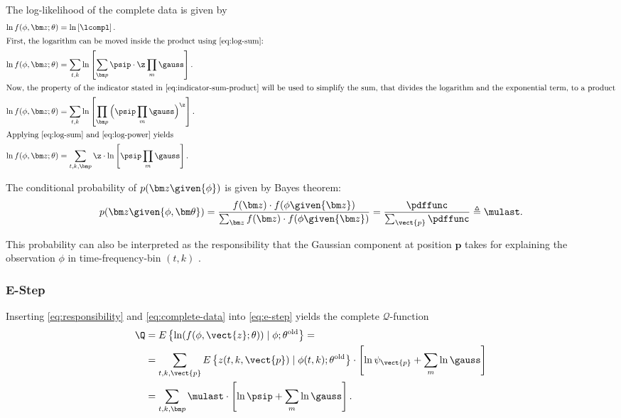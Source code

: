 The log-likelihood of the complete data is given by
\begin{align}
    \ln f(\phi,\bm z; \theta) &= \ln \left [ \lcompl \right ].\\
    \intertext{First, the logarithm can be moved inside the product using \eqref{eq:log-sum}:}
    \ln f(\phi,\bm z; \theta) &=\sum_{t,k}\ln \left [\sum_{\bm p}\psip\cdot\z\prod_{m}\gauss\right ].\\
    \intertext{Now, the property of the indicator stated in \eqref{eq:indicator-sum-product} will be used to simplify the sum, that divides the logarithm and the exponential term, to a product}
    \ln f(\phi,\bm z; \theta) &=\sum_{t,k}\ln \left [\prod_{\bm p}\Big (\psip\prod_{m}\gauss\Big )^{\z}\right ].\\
    \intertext{Applying \eqref{eq:log-sum} and \eqref{eq:log-power} yields}
    \label{eq:complete-data}
    \ln f(\phi,\bm z; \theta) &=\sum_{t,k,\bm p}\z\cdot\ln \left [\psip\prod_{m}\gauss\right ].
\end{align}

The conditional probability of $p(\bm z\given{\phi})$ is given by Bayes theorem:
\begin{equation}
\label{eq:responsibility}
    p(\bm z\given{\phi,\bm\theta})=\frac{f(\bm z)\cdot f(\phi\given{\bm z})}{\sum_{\bm z}f(\bm z)\cdot f(\phi\given{\bm z})}=\frac{\pdffunc}{\sum_{\vect{p}}\pdffunc}\triangleq\mulast .
\end{equation}

This probability can also be interpreted as the responsibility that the Gaussian component at position $\bm p$ takes for explaining the observation $\phi$ in time-frequency-bin $(t,k)$ \cite[p.432]{Bishop2006}.

\subsubsection*{E-Step}
Inserting \eqref{eq:responsibility} and \eqref{eq:complete-data} into \eqref{eq:e-step} yields the complete $\mathcal{Q}$-function
\begin{align}
    \Q &=E\left\{\ln(f(\phi,\vect{z};\theta))\mid \phi;\theta^{\text{old}}\right\}=\\
       &=\sum_{t,k,\vect{p}}E\left\{z(t,k,\vect{p})\mid\phi(t,k);\theta^{\text{old}}\right\}\cdot\left [ \ln\psi_{\vect{p}}+\sum_{m}\ln\gauss\right]\nonumber\\
       &= \sum_{t,k,\bm p}\mulast\cdot\left [\ln\psip+\sum_{m}\ln\gauss\right ].
\end{align}

